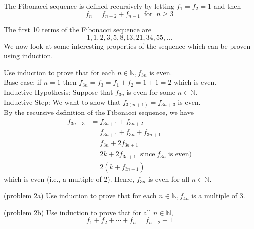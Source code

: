 \documentclass[handout]{ximera}
\begin{document}
\begin{definition}
The Fibonacci sequence is defined recursively by letting $f_1 = f_2 = 1$ and then
\[
f_n = f_{n-2} + f_{n-1}\;\; \text{for}\;\; n \geq 3
\]
\end{definition}

The first 10 terms of the Fibonacci sequence are
\[
1, 1, 2, 3, 5, 8, 13, 21, 34, 55,...
\]
We now look at some interesting properties of the sequence which can be proven using induction.

\begin{example}[example 2]
Use induction to prove that for each $n \in \mathbb{N}, f_{3n}$ is even.\\
Base case: if $n=1$ then $f_{3n} = f_3 = f_1 + f_2 = 1+1 = 2$ which is even.\\
Inductive Hypothesis: Suppose that $f_{3n}$ is even for some $n \in \mathbb{N}$.\\
Inductive Step: We want to show that $f_{3(n+1)} = f_{3n+3}$ is even.\\
By the recursive definition of the Fibonacci sequence, we have 
\begin{align*}
f_{3n+3} &= f_{3n+1} + f_{3n+2}\\
        &= f_{3n+1} + f_{3n} + f_{3n+1}\\
        &= f_{3n} + 2f_{3n+1}\\
        &= 2k  +  2f_{3n+1}  \;\;\text{since} \; f_{3n} \; \text{is even})\\
        &= 2(k + f_{3n+1})
\end{align*}
which is even (i.e., a multiple of 2).
Hence, $f_{3n}$ is even for all $n \in \mathbb{N}$.
\end{example} 


\begin{problem}(problem 2a)
Use induction to prove that for each $n \in \mathbb{N}, f_{4n}$ is a multiple of 3.
\end{problem} 
\begin{problem}(problem 2b)
Use induction to prove that for all  $n \in \mathbb{N}$,
\[
f_1 + f_2 + \cdots + f_n = f_{n+2} - 1
\]
\end{problem}
\end{document}
